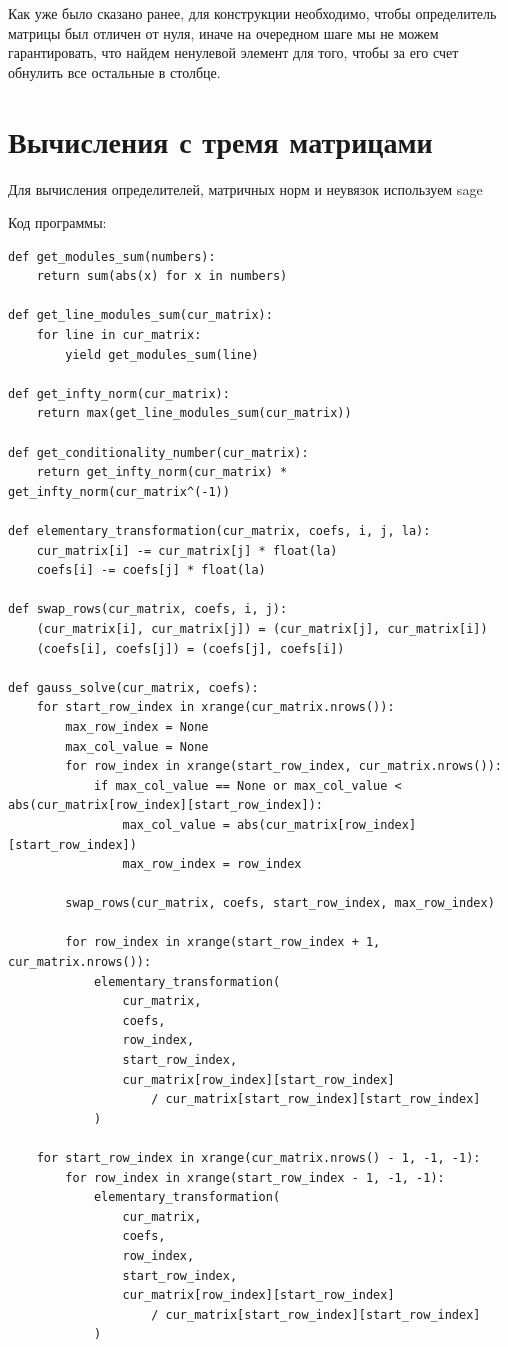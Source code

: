 \documentclass[12pt,reqno]{amsart}
\theoremstyle{definition}
\theoremstyle{remark}
\begin{document}
Как уже было сказано ранее, для конструкции необходимо, чтобы определитель матрицы был отличен от нуля, иначе на очередном шаге мы не можем гарантировать, что найдем ненулевой элемент для того, чтобы за его счет обнулить все остальные в столбце.

\section*{Вычисления с тремя матрицами}

Для вычисления определителей, матричных норм и неувязок используем sage

Код программы:

\begin{lstlisting}
def get_modules_sum(numbers):
	return sum(abs(x) for x in numbers)

def get_line_modules_sum(cur_matrix):
	for line in cur_matrix:
		yield get_modules_sum(line)

def get_infty_norm(cur_matrix):
	return max(get_line_modules_sum(cur_matrix))

def get_conditionality_number(cur_matrix):
	return get_infty_norm(cur_matrix) * get_infty_norm(cur_matrix^(-1))

def elementary_transformation(cur_matrix, coefs, i, j, la):
	cur_matrix[i] -= cur_matrix[j] * float(la)
	coefs[i] -= coefs[j] * float(la)

def swap_rows(cur_matrix, coefs, i, j):
	(cur_matrix[i], cur_matrix[j]) = (cur_matrix[j], cur_matrix[i])
	(coefs[i], coefs[j]) = (coefs[j], coefs[i])

def gauss_solve(cur_matrix, coefs):
	for start_row_index in xrange(cur_matrix.nrows()):
		max_row_index = None
		max_col_value = None
		for row_index in xrange(start_row_index, cur_matrix.nrows()):
			if max_col_value == None or max_col_value < abs(cur_matrix[row_index][start_row_index]):
				max_col_value = abs(cur_matrix[row_index][start_row_index])
				max_row_index = row_index

		swap_rows(cur_matrix, coefs, start_row_index, max_row_index)

		for row_index in xrange(start_row_index + 1, cur_matrix.nrows()):
			elementary_transformation(
				cur_matrix,
				coefs,
				row_index,
				start_row_index,
				cur_matrix[row_index][start_row_index]
					/ cur_matrix[start_row_index][start_row_index]
			)

	for start_row_index in xrange(cur_matrix.nrows() - 1, -1, -1):
		for row_index in xrange(start_row_index - 1, -1, -1):
			elementary_transformation(
				cur_matrix,
				coefs,
				row_index,
				start_row_index,
				cur_matrix[row_index][start_row_index]
					/ cur_matrix[start_row_index][start_row_index]
			)


\end{lstlisting}
\end{document}
